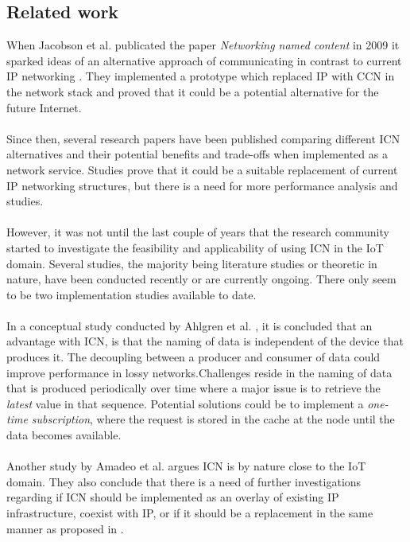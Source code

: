 \subsection{Related work}
When Jacobson et al. publicated the paper \textit{Networking named content} in 2009 it sparked ideas of an alternative approach of communicating in contrast to current IP networking \cite{Jacobson2009}. They implemented a prototype which replaced IP with CCN in the network stack and proved that it could be a potential alternative for the future Internet.\\\\
Since then, several research papers have been published comparing different ICN alternatives and their potential benefits and trade-offs when implemented as a network service\cite{Ahlgren2012}. Studies prove that it could be a suitable replacement of current IP networking structures, but there is a need for more performance analysis and studies\cite{Ahlgren2012}\cite{Greek-ICN-networking-survey-2014}.\\\\
However, it was not until the last couple of years that the research community started to investigate the feasibility and applicability of using ICN in the IoT domain. Several studies, the majority being literature studies or theoretic in nature, have been conducted recently or are currently ongoing. There only seem to be two implementation studies available to date.\\\\
In a conceptual study conducted by Ahlgren et al. \cite{Ahlgreniot}, it is concluded that an advantage with ICN, is that the naming of data is independent of the device that produces it. The decoupling between a producer and consumer of data could improve performance in lossy networks.Challenges reside in the naming of data that is produced periodically over time where a major issue is to retrieve the \textit{latest} value in that sequence. Potential solutions could be to implement a \textit{one-time subscription}, where the request is stored in the cache at the node until the data becomes available\cite{Ahlgreniot}.\\\\
Another study by Amadeo et al. \cite{iotchop} argues ICN is by nature close to the IoT domain. They also conclude that there is a need of further investigations regarding if ICN should be implemented as an overlay of existing IP infrastructure, coexist with IP, or if it should be a replacement in the same manner as proposed in \cite{Jacobson2009}.\\\\
